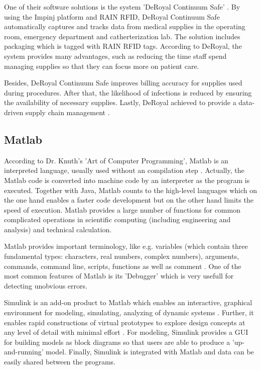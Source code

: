 One of their software solutions is the system 'DeRoyal Continuum Safe' \cite{deroyal}. By using the Impinj platform and RAIN RFID, DeRoyal Continuum Safe automatically captures and tracks data from medical supplies in the operating room, emergency department and catherterization lab. The solution includes packaging which is tagged with RAIN RFID tags. According to DeRoyal, the system provides many advantages, such as reducing the time staff spend managing supplies so that they can focus more on patient care. 

Besides, DeRoyal Continuum Safe improves billing accuracy for supplies used during procedures. After that, the likelihood of infections is reduced by ensuring the availability of necessary supplies. Lastly, DeRoyal achieved to provide a data-driven supply chain management \cite{deroyal}. 

\subsection{Matlab}

According to Dr. Knuth's 'Art of Computer Programming', Matlab is an interpreted language, usually used without an compilation step \cite[lesson 1]{introduction_matlab}. Actually, the Matlab code is converted into machine code by an interpreter as the program is executed. Together with Java, Matlab counts to the high-level languages which on the one hand enables a faster code development but on the other hand limits the speed of execution. Matlab provides a large number of functions for common complicated operations in scientific computing (including engineering and analysis) and technical calculation.

Matlab provides important terminology, like e.g. variables (which contain three fundamental types: characters, real numbers, complex numbers), arguments, commands, command line, scripts, functions as well as comment \cite[lesson 1]{introduction_matlab}. 
One of the most common features of Matlab is its 'Debugger' \cite[lesson 8]{introduction_matlab} which is very usefull for detecting unobvious errors.

Simulink is an add-on product to Matlab which enables an interactive, graphical environment for modeling, simulating, analyzing of dynamic systems \cite[p.313 ff.]{simulink}. Further, it enables rapid constructions of virtual prototypes to explore design concepts at any level of detail with minimal effort \cite[p.313 ff.]{simulink}. For modeling, Simulink provides a GUI for building models as block diagrams so that users are able to produce a 'up-and-running' model. Finally, Simulink is integrated with Matlab and data can be easily shared between the programs.

